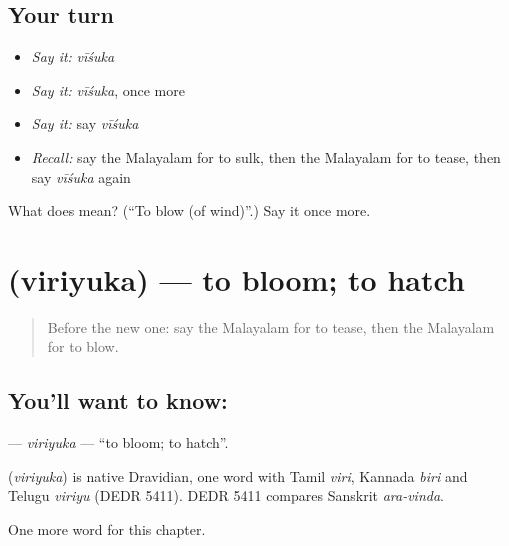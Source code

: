 \subsection*{Your turn}
\begin{itemize}
\raggedright
  \item \emph{Say it:} \emph{vīśuka}
  \item \emph{Say it:} \emph{vīśuka}, once more
  \item \emph{Say it:} say \emph{vīśuka}
  \item \emph{Recall:} say the Malayalam for to sulk, then the Malayalam for to tease, then say \emph{vīśuka} again
\end{itemize}

\begin{tcolorbox}[breakable,colback=teal!4,colframe=teal!35!black,title={Before you move on}]
What does  mean? (\textquotedblleft{}To blow (of wind)\textquotedblright{}.) Say it once more.
\end{tcolorbox}
\section[\texorpdfstring{\ml{വിരിയുക} (viriyuka)}{വിരിയുക (viriyuka)}]{ (viriyuka) — to bloom; to hatch}

\label{lesson:ML-C187-viriyuka}



\begin{quote}
Before the new one: say the Malayalam for to tease, then the Malayalam for to blow.
\end{quote}

\subsection*{You'll want to know: }
\textbf{} — \emph{viriyuka} — \textquotedblleft{}to bloom; to hatch\textquotedblright{}.

\begin{cousinweb}
\textbf{} (\emph{viriyuka}) is native Dravidian, one word with Tamil \emph{viri}, Kannada \emph{biri} and Telugu \emph{viriyu} (DEDR 5411). DEDR 5411 compares Sanskrit \emph{ara-vinda}.
\end{cousinweb}

\begin{grammarlens}[title={What you've built}]
One more word for this chapter.
\end{grammarlens}

